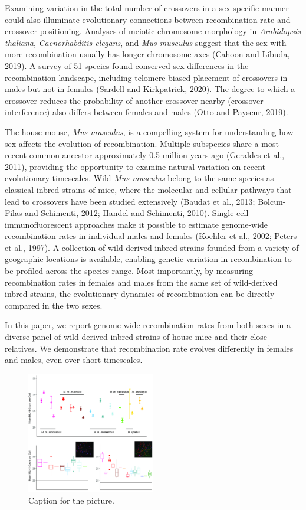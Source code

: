 \documentclass[
]{article}
\begin{document}
Examining variation in the total number of crossovers in a sex-specific
manner could also illuminate evolutionary connections between
recombination rate and crossover positioning. Analyses of meiotic
chromosome morphology in \emph{Arabidopsis thaliana},
\emph{Caenorhabditis elegans}, and \emph{Mus musculus} suggest that the
sex with more recombination usually has longer chromosome axes (Cahoon
and Libuda, 2019). A survey of 51 species found conserved sex
differences in the recombination landscape, including telomere-biased
placement of crossovers in males but not in females (Sardell and
Kirkpatrick, 2020). The degree to which a crossover reduces the
probability of another crossover nearby (crossover interference) also
differs between females and males (Otto and Payseur, 2019).

The house mouse, \emph{Mus musculus}, is a compelling system for
understanding how sex affects the evolution of recombination. Multiple
subspecies share a most recent common ancestor approximately 0.5 million
years ago (Geraldes et al., 2011), providing the opportunity to examine
natural variation on recent evolutionary timescales. Wild \emph{Mus
musculus} belong to the same species as classical inbred strains of
mice, where the molecular and cellular pathways that lead to crossovers
have been studied extensively (Baudat et al., 2013; Bolcun-Filas and
Schimenti, 2012; Handel and Schimenti, 2010). Single-cell
immunofluorescent approaches make it possible to estimate genome-wide
recombination rates in individual males and females (Koehler et al.,
2002; Peters et al., 1997). A collection of wild-derived inbred strains
founded from a variety of geographic locations is available, enabling
genetic variation in recombination to be profiled across the species
range. Most importantly, by measuring recombination rates in females and
males from the same set of wild-derived inbred strains, the evolutionary
dynamics of recombination can be directly compared in the two sexes.

In this paper, we report genome-wide recombination rates from both sexes
in a diverse panel of wild-derived inbred strains of house mice and
their close relatives. We demonstrate that recombination rate evolves
differently in females and males, even over short timescales.

\begin{figure}
\centering
\includegraphics[width=0.5\textwidth,height=\textheight]{Figure1.jpg}
\caption{Caption for the picture.}
\end{figure}
\end{document}
